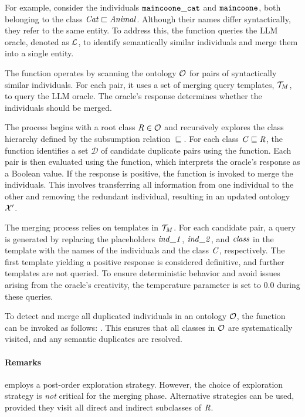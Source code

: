 For example, consider the individuals $\instance{maincoone\_cat}$ and $\instance{maincoone}$, both belonging to the class $\concept{Cat} \sqsubset \concept{Animal}$.
%
Although their names differ syntactically, they refer to the same entity.
%
To address this, the \merge{} function queries the \gls{LLM} oracle, denoted as $\relset{L}$, to identify semantically similar individuals and merge them into a single entity.


The \merge{} function operates by scanning the ontology $\relset{O}$ for pairs of syntactically similar individuals.
%
For each pair, it uses a set of merging query templates, $\relset{T}_{M}$, to query the \gls{LLM} oracle.
%
The oracle's response determines whether the individuals should be merged.


The process begins with a root class $\concept{R} \in \relset{O}$ and recursively explores the class hierarchy defined by the subsumption relation $\sqsubseteq$.
%
For each class $\concept{C} \sqsubseteq \concept{R}$, the function identifies a set $\mathcal{D}$ of candidate duplicate pairs using the \synSimilar{} function.
%
Each pair is then evaluated using the \extractBinary{} function, which interprets the oracle's response as a Boolean value.
%
If the response is positive, the \mergeInst{} function is invoked to merge the individuals.
%
This involves transferring all information from one individual to the other and removing the redundant individual, resulting in an updated ontology $\relset{X}'$.


The merging process relies on templates in $\relset{T}_{M}$.
%
For each candidate pair, a query is generated by replacing the placeholders $\mathit{ind\_1}$, $\mathit{ind\_2}$, and $\mathit{class}$ in the template with the names of the individuals and the class $\concept{C}$, respectively.
%
The first template yielding a positive response is considered definitive, and further templates are not queried.
%
To ensure deterministic behavior and avoid issues arising from the oracle's creativity, the temperature parameter is set to 0.0 during these queries.


To detect and merge all duplicated individuals in an ontology $\relset{O}$, the function can be invoked as follows:
%
.
%
This ensures that all classes in $\relset{O}$ are systematically visited, and any semantic duplicates are resolved.


\paragraph{Remarks}
%
 employs a post-order exploration strategy.
%
However, the choice of exploration strategy is \emph{not} critical for the merging phase.
%
Alternative strategies can be used, provided they visit all direct and indirect subclasses of $\concept{R}$.


